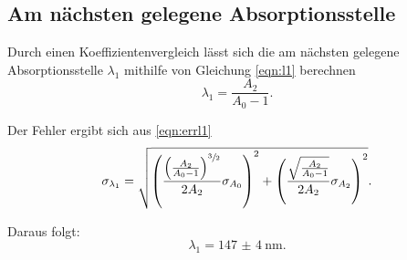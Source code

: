 \subsection{Am nächsten gelegene Absorptionsstelle}

Durch einen Koeffizientenvergleich lässt sich die am nächsten gelegene Absorptionsstelle $\lambda_1$ mithilfe von Gleichung \eqref{eqn:l1} berechnen
\begin{equation}
  \lambda_1 = \frac{A_2}{A_0-1}.
  \label{eqn:l1}
\end{equation}

Der Fehler ergibt sich aus \eqref{eqn:errl1}
\begin{equation}
  \sigma_{\lambda_1} = \sqrt{\left(\frac{\left(\frac{A_2}{A_0-1}\right)^{\sfrac{3}{2}}}{2 A_2} \sigma_{A_0}\right)^2 + \left(\frac{\sqrt{\frac{A_2}{A_0-1}}}{2 A_2} \sigma_{A_2} \right)^2} \text{.}
  \label{eqn:errl1}
\end{equation}

Daraus folgt:
\begin{equation*}
  \lambda_1 = \SI{147(4)}{\nm}\text{.}
\end{equation*}
